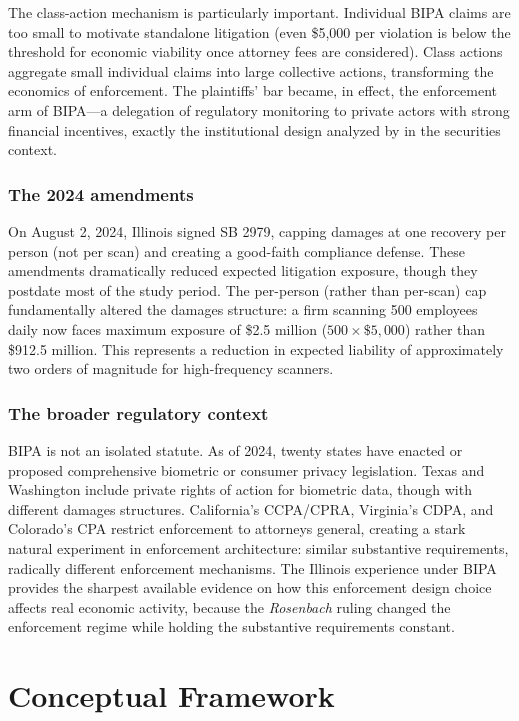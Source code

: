 \documentclass[12pt]{article}
\begin{document}
The class-action mechanism is particularly important. Individual BIPA claims are too small to motivate standalone litigation (even \$5,000 per violation is below the threshold for economic viability once attorney fees are considered). Class actions aggregate small individual claims into large collective actions, transforming the economics of enforcement. The plaintiffs' bar became, in effect, the enforcement arm of BIPA---a delegation of regulatory monitoring to private actors with strong financial incentives, exactly the institutional design analyzed by \citet{coffee1986} in the securities context.

\subsubsection*{The 2024 amendments} On August 2, 2024, Illinois signed SB 2979, capping damages at one recovery per person (not per scan) and creating a good-faith compliance defense. These amendments dramatically reduced expected litigation exposure, though they postdate most of the study period. The per-person (rather than per-scan) cap fundamentally altered the damages structure: a firm scanning 500 employees daily now faces maximum exposure of \$2.5 million ($500 \times \$5{,}000$) rather than \$912.5 million. This represents a reduction in expected liability of approximately two orders of magnitude for high-frequency scanners.

\subsubsection*{The broader regulatory context} BIPA is not an isolated statute. As of 2024, twenty states have enacted or proposed comprehensive biometric or consumer privacy legislation. Texas and Washington include private rights of action for biometric data, though with different damages structures. California's CCPA/CPRA, Virginia's CDPA, and Colorado's CPA restrict enforcement to attorneys general, creating a stark natural experiment in enforcement architecture: similar substantive requirements, radically different enforcement mechanisms. The Illinois experience under BIPA provides the sharpest available evidence on how this enforcement design choice affects real economic activity, because the \textit{Rosenbach} ruling changed the enforcement regime while holding the substantive requirements constant.

\section{Conceptual Framework}
\label{sec:framework}
\end{document}

